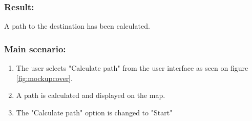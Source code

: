 \begin{framed}
	\subsubsection*{Result:}
	A path to the destination has been calculated.
	
	\subsubsection*{Main scenario:}
	\begin{enumerate}
		\item The user selects "Calculate path" from the user interface as seen on figure \ref{fig:mockupcover}.
		\item A path is calculated and displayed on the map. 
		\item The "Calculate path" option is changed to "Start"
	\end{enumerate}	
\end{framed}	

